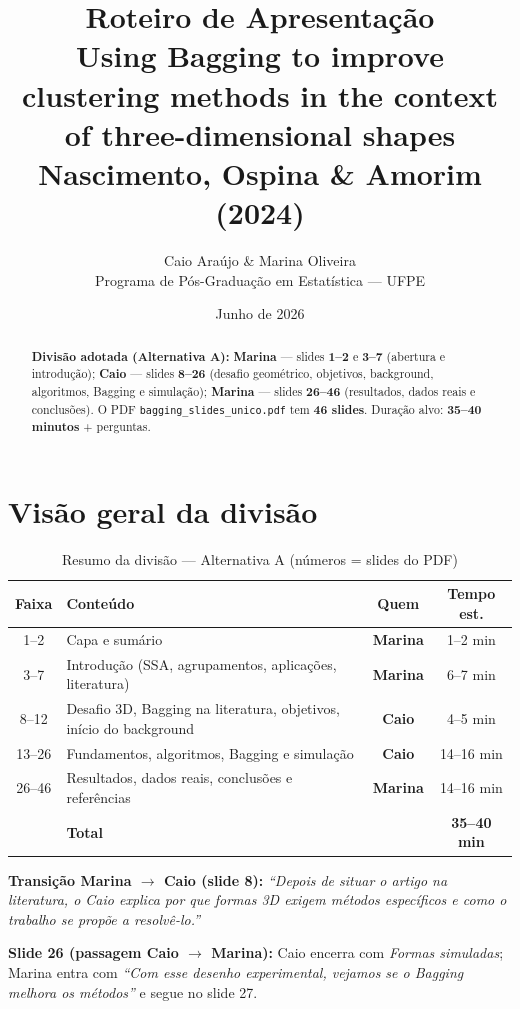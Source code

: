 \documentclass[12pt,a4paper]{article}
\title{\textbf{Roteiro de Apresentação}\\[0.2cm]
\large Using Bagging to improve clustering methods in the context of three-dimensional shapes\\[0.15cm]
\normalsize Nascimento, Ospina \& Amorim (2024)}
\author{Caio Araújo \& Marina Oliveira\\Programa de Pós-Graduação em Estatística --- UFPE}
\date{Junho de 2026}
\begin{document}
\maketitle

\begin{abstract}
\noindent
\textbf{Divisão adotada (Alternativa A):}
\textbf{Marina} --- slides \textbf{1--2} e \textbf{3--7} (abertura e introdução);
\textbf{Caio} --- slides \textbf{8--26} (desafio geométrico, objetivos, background, algoritmos, Bagging e simulação);
\textbf{Marina} --- slides \textbf{26--46} (resultados, dados reais e conclusões).
O PDF \texttt{bagging\_slides\_unico.pdf} tem \textbf{46 slides}.
Duração alvo: \textbf{35--40 minutos} + perguntas.
\end{abstract}

\tableofcontents
\newpage

\section{Visão geral da divisão}

\begin{table}[h]
\centering
\caption{Resumo da divisão --- Alternativa A (números = slides do PDF)}
\begin{tabular}{@{}clcc@{}}
\toprule
\textbf{Faixa} & \textbf{Conteúdo} & \textbf{Quem} & \textbf{Tempo est.} \\
\midrule
1--2 & Capa e sumário & \textbf{Marina} & 1--2 min \\
3--7 & Introdução (SSA, agrupamentos, aplicações, literatura) & \textbf{Marina} & 6--7 min \\
8--12 & Desafio 3D, Bagging na literatura, objetivos, início do background & \textbf{Caio} & 4--5 min \\
13--26 & Fundamentos, algoritmos, Bagging e simulação & \textbf{Caio} & 14--16 min \\
26--46 & Resultados, dados reais, conclusões e referências & \textbf{Marina} & 14--16 min \\
\midrule
 & \textbf{Total} & & \textbf{35--40 min} \\
\bottomrule
\end{tabular}
\end{table}

\begin{dica}
\textbf{Transição Marina $\rightarrow$ Caio (slide 8):}
\emph{``Depois de situar o artigo na literatura, o Caio explica por que formas 3D exigem métodos específicos e como o trabalho se propõe a resolvê-lo.''}

\textbf{Slide 26 (passagem Caio $\rightarrow$ Marina):}
Caio encerra com \emph{Formas simuladas}; Marina entra com
\emph{``Com esse desenho experimental, vejamos se o Bagging melhora os métodos''}
e segue no slide 27.
\end{dica}
\end{document}
